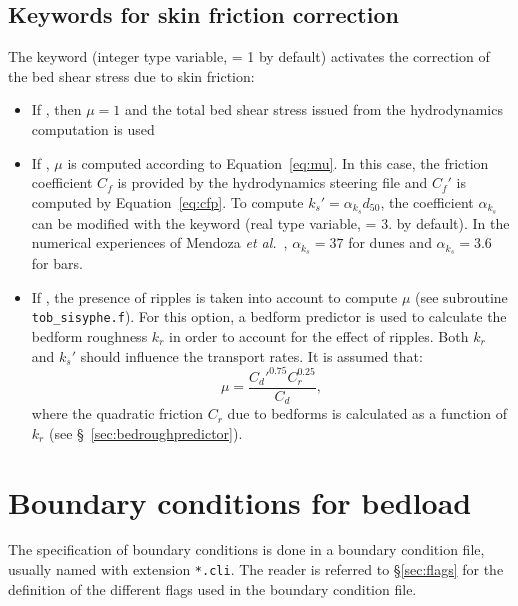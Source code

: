 \subsection{Keywords for skin friction correction}
The keyword  (integer type variable, {\ttfamily = 1} by default) activates the correction of the bed shear stress due to skin friction:
\begin{itemize}
\item If , then $\mu=1$ and the total bed shear stress issued from the hydrodynamics computation is used
\item If , $\mu$ is computed according to Equation~\ref{eq:mu}. In this case, the friction coefficient $C_f$ is provided by the hydrodynamics steering file and $C_f'$ is computed by Equation~\ref{eq:cfp}. To compute $k_s'=\alpha_{k_s} d_{50}$, the coefficient $\alpha_{k_s}$ can be modified with the keyword  (real type variable, {\ttfamily = 3.} by default). In the numerical experiences of Mendoza \textit{et al.}~\cite{Mendoza15}, $\alpha_{k_s}=37$ for dunes and $\alpha_{k_s}=3.6$ for bars.  
\item If , the presence of ripples is taken into account to compute $\mu$ (see subroutine \texttt{tob\_sisyphe.f}). For this option, a bedform predictor is used to calculate the bedform roughness $k_r$ in order to account for the effect of ripples. Both $k_r$
and $k_s'$ should influence the transport rates. It is assumed that:
\begin{equation}\label{eq:mu}
\mu =\frac{C_d'^{0.75} C_r^{0.25}}{C_d}, 
\end{equation}
where the quadratic friction $C_r$ due to bedforms is calculated as a
function of $k_r$ (see \S~\ref{sec:bedroughpredictor}). 
\end{itemize}

\section{Boundary conditions for bedload}
The specification of boundary conditions is done in a boundary condition file, usually named with extension \texttt{*.cli}. The reader is referred to \S\ref{sec:flags} for the definition of the different flags used in the boundary condition file.

